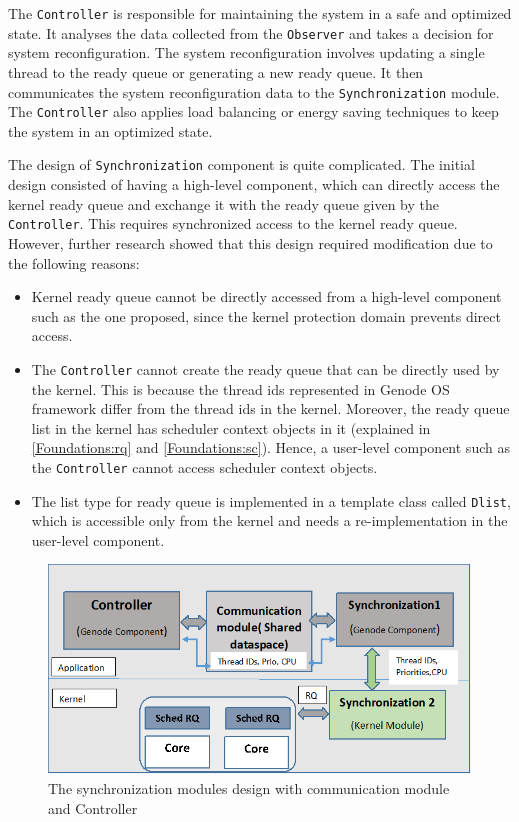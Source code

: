 The \texttt{Controller} is responsible for maintaining the system in a safe and optimized state. It analyses the data collected from the \texttt{Observer} and takes a decision for system reconfiguration\cite{kia4sm}. The system reconfiguration involves updating a single thread to the ready queue or generating a new ready queue. It then communicates the system reconfiguration data to the \texttt{Synchronization} module. The \texttt{Controller} also applies load balancing or energy saving techniques to keep the system in an optimized state.

The design of \texttt{Synchronization} component is quite complicated. The initial design consisted of having a high-level component, which can directly access the kernel ready queue and exchange it with the ready queue given by the \texttt{Controller}. This requires synchronized access to the kernel ready queue. However, further research showed that this design required modification due to the following reasons:  

\begin{itemize}
\item Kernel ready queue cannot be directly accessed from a high-level component such as the one proposed, since the kernel protection domain prevents direct access.

\item The \texttt{Controller} cannot create the ready queue that can be directly used by the kernel. This is because the
thread ids represented in Genode OS framework differ from the thread ids in the kernel. Moreover, the ready queue list in the kernel has scheduler context objects in it (explained in \ref{Foundations:rq} and \ref{Foundations:sc}). Hence, a user-level component such as the \texttt{Controller} cannot access scheduler context objects.

\item The list type for ready queue is implemented in a template class called \texttt{Dlist}, which is accessible only from the kernel and needs a re-implementation in the user-level component.

\end{itemize}

\begin{figure}[h]
	\centering
	\includegraphics[width=0.7\linewidth]{figures/Abstract_design.png}
	\caption{The synchronization modules design with communication module and Controller}
	\label{fig:abstractdesign}
\end{figure}


